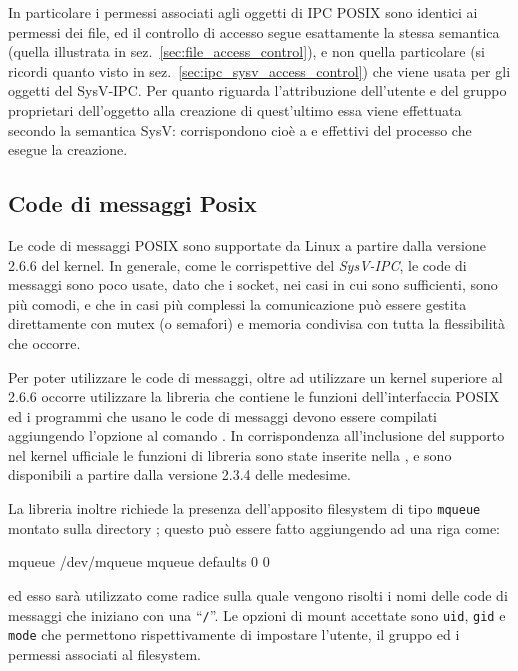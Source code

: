 In particolare i permessi associati agli oggetti di IPC POSIX sono identici ai
permessi dei file, ed il controllo di accesso segue esattamente la stessa
semantica (quella illustrata in sez.~\ref{sec:file_access_control}), e non
quella particolare (si ricordi quanto visto in
sez.~\ref{sec:ipc_sysv_access_control}) che viene usata per gli oggetti del
SysV-IPC. Per quanto riguarda l'attribuzione dell'utente e del gruppo
proprietari dell'oggetto alla creazione di quest'ultimo essa viene effettuata
secondo la semantica SysV: corrispondono cioè a  e  effettivi
del processo che esegue la creazione.


\subsection{Code di messaggi Posix}
\label{sec:ipc_posix_mq}

Le code di messaggi POSIX sono supportate da Linux a partire dalla versione
2.6.6 del kernel. In generale, come le corrispettive del \textit{SysV-IPC}, le
code di messaggi sono poco usate, dato che i socket, nei casi in cui sono
sufficienti, sono più comodi, e che in casi più complessi la comunicazione può
essere gestita direttamente con mutex (o semafori) e memoria condivisa con
tutta la flessibilità che occorre.

Per poter utilizzare le code di messaggi, oltre ad utilizzare un kernel
superiore al 2.6.6 occorre utilizzare la libreria  che contiene le
funzioni dell'interfaccia POSIX ed i programmi che usano le code di messaggi
devono essere compilati aggiungendo l'opzione  al comando
. In corrispondenza all'inclusione del supporto nel kernel ufficiale
le funzioni di libreria sono state inserite nella , e sono
disponibili a partire dalla versione 2.3.4 delle medesime.

La libreria inoltre richiede la presenza dell'apposito filesystem di tipo
\texttt{mqueue} montato sulla directory ; questo può essere
fatto aggiungendo ad  una riga come:
\begin{FileExample}[label=/etc/fstab]
mqueue   /dev/mqueue       mqueue    defaults        0      0
\end{FileExample}
ed esso sarà utilizzato come radice sulla quale vengono risolti i nomi delle
code di messaggi che iniziano con una ``\texttt{/}''. Le opzioni di mount
accettate sono \texttt{uid}, \texttt{gid} e \texttt{mode} che permettono
rispettivamente di impostare l'utente, il gruppo ed i permessi associati al
filesystem.


